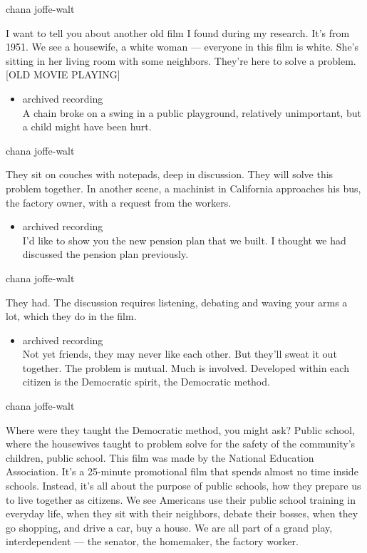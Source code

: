 chana joffe-walt

I want to tell you about another old film I found during my research.
It's from 1951. We see a housewife, a white woman --- everyone in this
film is white. She's sitting in her living room with some neighbors.
They're here to solve a problem. {[}OLD MOVIE PLAYING{]}

\begin{itemize}
\tightlist
\item
  archived recording\\
  A chain broke on a swing in a public playground, relatively
  unimportant, but a child might have been hurt.
\end{itemize}

chana joffe-walt

They sit on couches with notepads, deep in discussion. They will solve
this problem together. In another scene, a machinist in California
approaches his bus, the factory owner, with a request from the workers.

\begin{itemize}
\tightlist
\item
  archived recording\\
  I'd like to show you the new pension plan that we built. I thought we
  had discussed the pension plan previously.
\end{itemize}

chana joffe-walt

They had. The discussion requires listening, debating and waving your
arms a lot, which they do in the film.

\begin{itemize}
\tightlist
\item
  archived recording\\
  Not yet friends, they may never like each other. But they'll sweat it
  out together. The problem is mutual. Much is involved. Developed
  within each citizen is the Democratic spirit, the Democratic method.
\end{itemize}

chana joffe-walt

Where were they taught the Democratic method, you might ask? Public
school, where the housewives taught to problem solve for the safety of
the community's children, public school. This film was made by the
National Education Association. It's a 25-minute promotional film that
spends almost no time inside schools. Instead, it's all about the
purpose of public schools, how they prepare us to live together as
citizens. We see Americans use their public school training in everyday
life, when they sit with their neighbors, debate their bosses, when they
go shopping, and drive a car, buy a house. We are all part of a grand
play, interdependent --- the senator, the homemaker, the factory worker.

